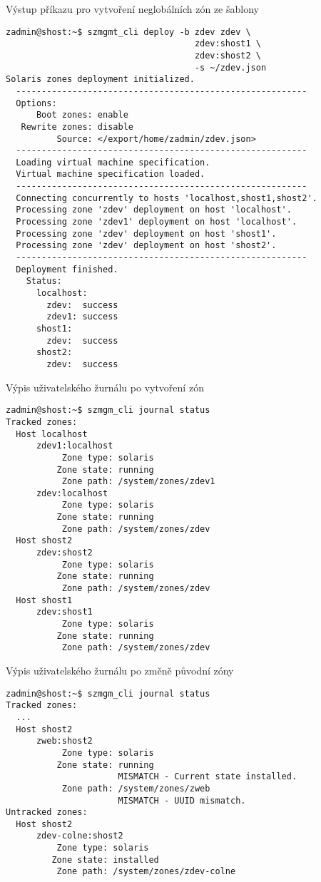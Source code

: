 \begin{listing}[ht]
  \caption{Výstup příkazu pro vytvoření neglobálních zón ze šablony}
  \label{code:test:deployment}
  \begin{verbatim}
zadmin@shost:~$ szmgmt_cli deploy -b zdev zdev \
                                     zdev:shost1 \
                                     zdev:shost2 \
                                     -s ~/zdev.json 
Solaris zones deployment initialized.
  ---------------------------------------------------------
  Options:
      Boot zones: enable
   Rewrite zones: disable
          Source: </export/home/zadmin/zdev.json>
  ---------------------------------------------------------
  Loading virtual machine specification.
  Virtual machine specification loaded.
  ---------------------------------------------------------
  Connecting concurrently to hosts 'localhost,shost1,shost2'.
  Processing zone 'zdev' deployment on host 'localhost'.
  Processing zone 'zdev1' deployment on host 'localhost'.
  Processing zone 'zdev' deployment on host 'shost1'.
  Processing zone 'zdev' deployment on host 'shost2'.
  ---------------------------------------------------------
  Deployment finished.
    Status:
      localhost:
        zdev:  success
        zdev1: success
      shost1:
        zdev:  success
      shost2:
        zdev:  success
  \end{verbatim}
\end{listing}

\begin{listing}[ht]
  \caption{Výpis uživatelského žurnálu po vytvoření zón}
  \label{code:test:journal}
  \begin{verbatim}
zadmin@shost:~$ szmgm_cli journal status
Tracked zones:
  Host localhost
      zdev1:localhost
           Zone type: solaris
          Zone state: running
           Zone path: /system/zones/zdev1
      zdev:localhost
           Zone type: solaris
          Zone state: running
           Zone path: /system/zones/zdev
  Host shost2
      zdev:shost2
           Zone type: solaris
          Zone state: running                      
           Zone path: /system/zones/zdev
  Host shost1
      zdev:shost1
           Zone type: solaris
          Zone state: running
           Zone path: /system/zones/zdev
  \end{verbatim}
\end{listing}

\begin{listing}[ht]
  \caption{Výpis uživatelského žurnálu po změně původní zóny}
  \label{code:test:journal:change}
  \begin{verbatim}
zadmin@shost:~$ szmgm_cli journal status
Tracked zones:
  ...
  Host shost2
      zweb:shost2
           Zone type: solaris
          Zone state: running
                      MISMATCH - Current state installed.
           Zone path: /system/zones/zweb
                      MISMATCH - UUID mismatch.
Untracked zones:
  Host shost2
      zdev-colne:shost2
          Zone type: solaris
         Zone state: installed
          Zone path: /system/zones/zdev-colne
  \end{verbatim}
\end{listing}

